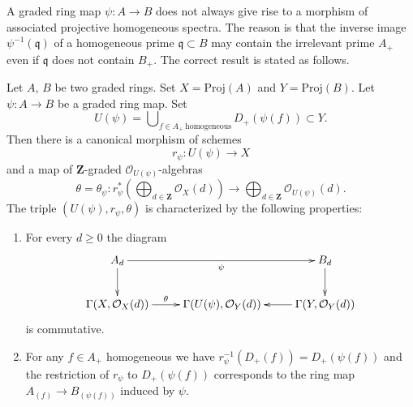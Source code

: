 \noindent
A graded ring map $\psi : A \to B$ does not always give rise to a morphism of
associated projective homogeneous spectra. The reason is that
the inverse image $\psi^{-1}(\mathfrak q)$
of a homogeneous prime $\mathfrak q \subset B$ may
contain the irrelevant prime $A_{+}$ even if $\mathfrak q$ does not
contain $B_{+}$.
The correct result is stated as follows.

\begin{lemma}
\label{lemma-morphism-proj}
Let $A$, $B$ be two graded rings.
Set $X = \text{Proj}(A)$ and $Y = \text{Proj}(B)$.
Let $\psi : A \to B$ be a graded ring map.
Set
$$
U(\psi)
=
\bigcup\nolimits_{f \in A_{+}\ \text{homogeneous}} D_{+}(\psi(f))
\subset Y.
$$
Then there is a canonical morphism of schemes
$$
r_\psi :
U(\psi)
\longrightarrow
X
$$
and a map of $\mathbf{Z}$-graded $\mathcal{O}_{U(\psi)}$-algebras
$$
\theta = \theta_\psi :
r_\psi^*\left(
\bigoplus\nolimits_{d \in \mathbf{Z}} \mathcal{O}_X(d)
\right)
\longrightarrow
\bigoplus\nolimits_{d \in \mathbf{Z}} \mathcal{O}_{U(\psi)}(d).
$$
The triple $(U(\psi), r_\psi, \theta)$ is
characterized by the following properties:
\begin{enumerate}
\item For every $d \geq 0$ the diagram
$$
\xymatrix{
A_d \ar[d] \ar[rr]_{\psi} & &
B_d \ar[d] \\
\Gamma(X, \mathcal{O}_X(d)) \ar[r]^-\theta &
\Gamma(U(\psi), \mathcal{O}_Y(d)) &
\Gamma(Y, \mathcal{O}_Y(d)) \ar[l]
}
$$
is commutative.
\item For any $f \in A_{+}$ homogeneous
we have $r_\psi^{-1}(D_{+}(f)) = D_{+}(\psi(f))$ and
the restriction of $r_\psi$ to $D_{+}(\psi(f))$
corresponds to the ring map
$A_{(f)} \to B_{(\psi(f))}$ induced by $\psi$.
\end{enumerate}
\end{lemma}

